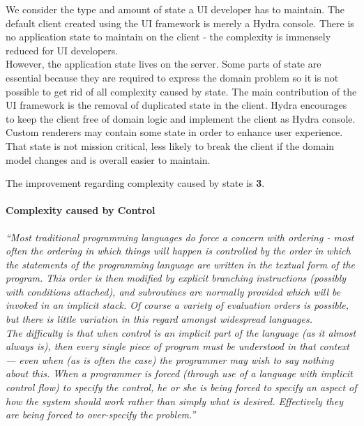 We consider the type and amount of state a UI developer has to maintain. The default client created using the UI framework is merely a Hydra \gls{console}. There is no application state to maintain on the client - the complexity is immensely reduced for UI developers. \\
However, the application state lives on the server. Some parts of state are essential because they are required to express the domain problem so it is not possible to get rid of all complexity caused by state. The main contribution of the UI framework is the removal of duplicated state in the client. Hydra encourages to keep the client free of domain logic and implement the client as Hydra \gls{console}. Custom renderers may contain some state in order to enhance user experience. That state is not mission critical, less likely to break the client if the domain model changes and is overall easier to maintain.

The improvement regarding complexity caused by state is \textbf{3}.

\paragraph{Complexity caused by Control}
\textit{``Most traditional programming languages do force a concern with ordering - most often the ordering in which things will happen is controlled by the order in which the statements of the programming language are written in the textual form of the program. This order is then modified by explicit branching instructions (possibly with conditions attached), and subroutines are normally provided which will be invoked in an implicit stack. Of course a variety of evaluation orders is possible, but there is little variation in this regard amongst widespread languages. \\ The difficulty is that when control is an implicit part of the language (as it almost always is), then every single piece of program must be understood in that context — even when (as is often the case) the programmer may wish to say nothing about this. When a programmer is forced (through use of a language with implicit control flow) to specify the control, he or she is being forced to specify an aspect of how the system should work rather than simply what is desired. Effectively they are being forced to over-specify the problem.''} \citep[p.~8]{outoftarpit}

